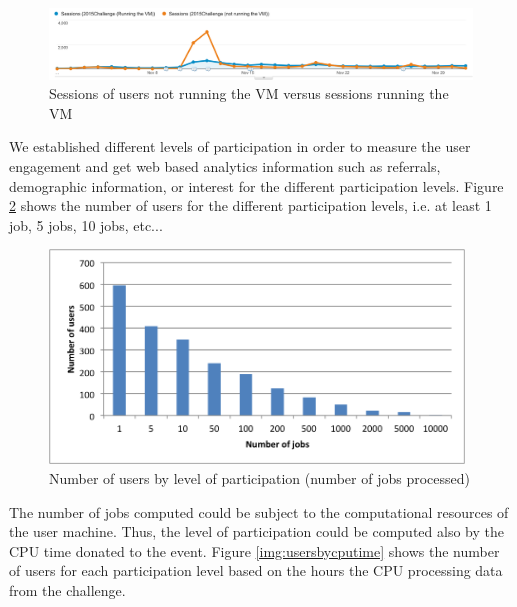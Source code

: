 \documentclass{article}
\begin{document}
\begin{figure}[th]
  \begin{center}
		\includegraphics[width=15cm]{imgs/sessionVSsessionVMRunning.png}
  \end{center}
\caption{Sessions of users not running the VM versus sessions running the VM}
\label{img:SessionsVSsessions running the VM}
\end{figure}



We established different levels of participation in order to measure the user engagement and get web based analytics information such as referrals, demographic information, or interest for the different participation levels. Figure \ref{img:usersbyjobs} shows the number of users for the different participation levels, i.e. at least 1 job, 5 jobs, 10 jobs, etc...



\begin{figure}[t]
  \begin{center}
		\includegraphics[width=11cm]{imgs/usersbyjobs.png}
  \end{center}
\caption{Number of users by level of participation (number of jobs processed)}
\label{img:usersbyjobs}
\end{figure}


The number of jobs computed could be subject to the computational resources of the user machine. Thus, the level of participation could be computed also by the CPU time donated to the event. Figure \ref{img:usersbycputime} shows the number of users for each participation level based on the hours the CPU processing data from the challenge. 
\end{document}
